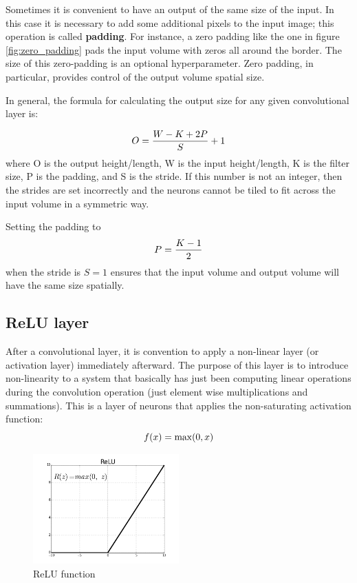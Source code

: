 Sometimes it is convenient to have an output of the same size of the input. In this case it is necessary to add some additional pixels to the input image; this operation is called \textbf{padding}. For instance, a zero padding like the one in figure \ref{fig:zero_padding} pads the input volume with zeros all around the border.
The size of this zero-padding is an optional hyperparameter. Zero padding, in particular, provides control of the output volume spatial size.

In general, the formula for calculating the output size for any given convolutional layer is:

\begin{equation} \notag
	O=\frac{W-K+2P}{S}+1
\end{equation}
where O is the output height/length, W is the input height/length, K is the filter size, P is the padding, and S is the stride. If this number is not an integer, then the strides are set incorrectly and the neurons cannot be tiled to fit across the input volume in a symmetric way.

Setting the padding to
\begin{equation} \notag
	P=\frac{K-1}{2}
\end{equation}
when the stride is $S=1$ ensures that the input volume and output volume will have the same size spatially.

\subsection{ReLU layer}

After a convolutional layer, it is convention to apply a non-linear layer (or activation layer) immediately afterward. The purpose of this layer is to introduce non-linearity to a system that basically has just been computing linear operations during the convolution operation (just element wise multiplications and summations). This is a layer of neurons that applies the non-saturating activation function:
\begin{equation} \notag
	f(x)=\max(0,x)
\end{equation}

\begin{figure}[!ht]
	\centering
	\includegraphics[width=0.5\textwidth]{Images/relu_function}
	\caption{\ac{ReLU} function}\label{fig:relu_function}
\end{figure}

